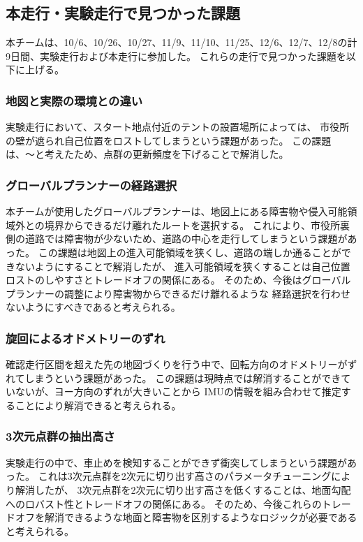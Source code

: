 \documentclass[twocolumn,9pt]{jsproceedings}
\begin{document}
\subsection{本走行・実験走行で見つかった課題}

本チームは、10/6、10/26、10/27、11/9、11/10、11/25、12/6、12/7、12/8の計9日間、実験走行および本走行に参加した。
これらの走行で見つかった課題を以下に上げる。
\subsubsection{地図と実際の環境との違い}
実験走行において、スタート地点付近のテントの設置場所によっては、
市役所の壁が遮られ自己位置をロストしてしまうという課題があった。
この課題は、〜と考えたため、点群の更新頻度を下げることで解消した。

\subsubsection{グローバルプランナーの経路選択}
本チームが使用したグローバルプランナーは、地図上にある障害物や侵入可能領域外との境界からできるだけ離れたルートを選択する。
これにより、市役所裏側の道路では障害物が少ないため、道路の中心を走行してしまうという課題があった。
この課題は地図上の進入可能領域を狭くし、道路の端しか通ることができないようにすることで解消したが、
進入可能領域を狭くすることは自己位置ロストのしやすさとトレードオフの関係にある。
そのため、今後はグローバルプランナーの調整により障害物からできるだけ離れるような
経路選択を行わせないようにすべきであると考えられる。

\subsubsection{旋回によるオドメトリーのずれ}
確認走行区間を超えた先の地図づくりを行う中で、回転方向のオドメトリーがずれてしまうという課題があった。
この課題は現時点では解消することができていないが、ヨー方向のずれが大きいことから
IMUの情報を組み合わせて推定することにより解消できると考えられる。

\subsubsection{3次元点群の抽出高さ}
実験走行の中で、車止めを検知することができず衝突してしまうという課題があった。
これは3次元点群を2次元に切り出す高さのパラメータチューニングにより解消したが、
3次元点群を2次元に切り出す高さを低くすることは、地面勾配へのロバスト性とトレードオフの関係にある。
そのため、今後これらのトレードオフを解消できるような地面と障害物を区別するようなロジックが必要であると考えられる。
\end{document}
